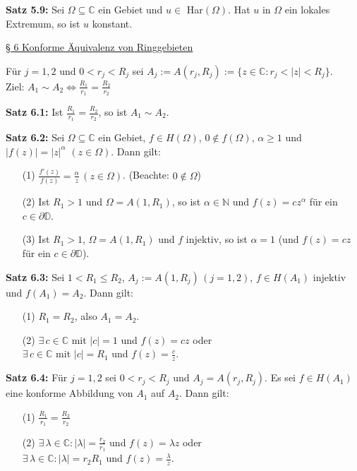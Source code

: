 \documentclass[11pt]{article}
\newcommand{\C}{\mathbb{C}}
\newcommand{\N}{\mathbb{N}}
\newcommand{\D}{\mathbb{D}}
\begin{document}
\textbf{Satz 5.9:} Sei $\Omega \subseteq \C$ ein Gebiet und $u \in$ Har$(\Omega)$. Hat $u$ in $\Omega$ ein lokales Extremum, so ist $u$ konstant.

\newpage
\underline{§ 6 Konforme Äquivalenz von Ringgebieten}

Für $j = 1,2$ und $0 < r_j < R_j$ sei $A_j := A(r_j, R_j) := \{ z \in \C \colon r_j < |z| < R_j \}$. \\
Ziel: $A_1 \sim A_2 \Leftrightarrow \frac{R_1}{r_1} = \frac{R_2}{r_2}$

\textbf{Satz 6.1:} Ist $\frac{R_1}{r_1} = \frac{R_2}{r_2}$, so ist $A_1 \sim A_2$.

\textbf{Satz 6.2:} Sei $\Omega \subseteq \C$ ein Gebiet, $f \in H(\Omega)$, $0 \notin f(\Omega)$, $\alpha \geq 1$ und $|f(z)| = |z|^\alpha$ $(z \in \Omega)$. Dann gilt: 
\vspace{-0.6cm}
\begin{itemize}
\item[(1)] $\frac{f'(z)}{f(z)} = \frac{\alpha}{z} \, (z \in \Omega)$. (Beachte: $0 \notin \Omega$) \vspace{-0.2cm}
\item[(2)] Ist $R_1 > 1$ und $\Omega = A(1, R_1)$, so ist $\alpha \in \N$ und $f(z) = cz^\alpha$ für ein $c \in \partial \D$. \vspace{-0.2cm}
\item[(3)] Ist $R_1 > 1$, $\Omega = A(1, R_1)$ und $f$ injektiv, so ist $\alpha = 1$ (und $f(z) = cz$ für ein $c \in \partial \D$).
\end{itemize}
\vspace{-0.3cm}

\textbf{Satz 6.3:} Sei $1 < R_1 \leq R_2$, $A_j := A(1, R_j) \, (j = 1,2)$, $f \in H(A_1)$ injektiv und $f(A_1) = A_2$. Dann gilt:
\vspace{-0.6cm}
\begin{itemize}
\item[(1)] $R_1 = R_2$, also $A_1 = A_2$. \vspace{-0.2cm}
\item[(2)] $\exists \, c \in \C$ mit $|c| = 1$ und $f(z) = cz$ oder \\
$\exists \, c \in \C$ mit $|c| = R_1$ und $f(z) = \frac{c}{z}$.
\end{itemize}
\vspace{-0.3cm}

\textbf{Satz 6.4:} Für $j = 1,2$ sei $0 < r_j < R_j$ und $A_j = A(r_j, R_j)$. Es sei $f \in H(A_1)$ eine konforme Abbildung von $A_1$ auf $A_2$. Dann gilt:
\vspace{-0.6cm}
\begin{itemize}
\item[(1)] $\frac{R_1}{r_1} = \frac{R_2}{r_2}$ \vspace{-0.2cm}
\item[(2)] $\exists \, \lambda \in \C \colon |\lambda| = \frac{r_2}{r_1}$ und $f(z) = \lambda z$ oder \\
$\exists \, \lambda \in \C \colon |\lambda| = r_2 R_1$ und $f(z) = \frac{\lambda}{z}$.
\end{itemize}
\vspace{-0.3cm}
\end{document}

